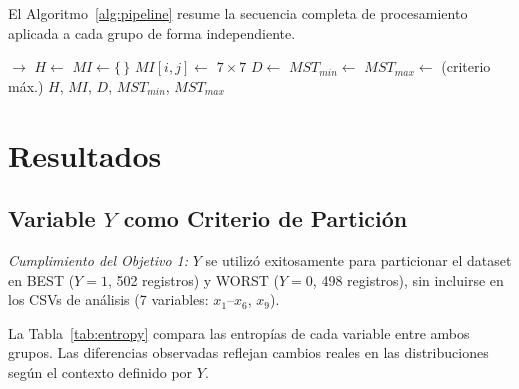\documentclass[12pt, a4paper]{article}
\begin{document}
El Algoritmo~\ref{alg:pipeline} resume la secuencia completa de
procesamiento aplicada a cada grupo de forma independiente.

\begin{algorithm}[H]
\caption{Pipeline Completo de Procesamiento}\label{alg:pipeline}
\begin{algorithmic}[1]
    \State {} $\to$ 
    \State $H \gets$  
    \State $MI \gets \{\,\}$ 
        \State $MI[i,j] \gets$ 
    \EndFor
    \State {} $7 \times 7$ 
    \State $D \gets$  
    \State $MST_{min} \gets$  
    \State $MST_{max} \gets$  (criterio máx.) 
    \State \Return $H$, $MI$, $D$, $MST_{min}$, $MST_{max}$
\EndFunction
\end{algorithmic}
\end{algorithm}

\section{Resultados}

\subsection{Variable $Y$ como Criterio de Partición}

\textit{Cumplimiento del Objetivo 1:} $Y$ se utilizó exitosamente para
particionar el dataset en BEST ($Y=1$, 502 registros) y WORST ($Y=0$,
498 registros), sin incluirse en los CSVs de análisis (7 variables:
$x_1$--$x_6$, $x_9$).

La Tabla~\ref{tab:entropy} compara las entropías de cada variable entre
ambos grupos. Las diferencias observadas reflejan cambios reales en las
distribuciones según el contexto definido por $Y$.
\end{document}
